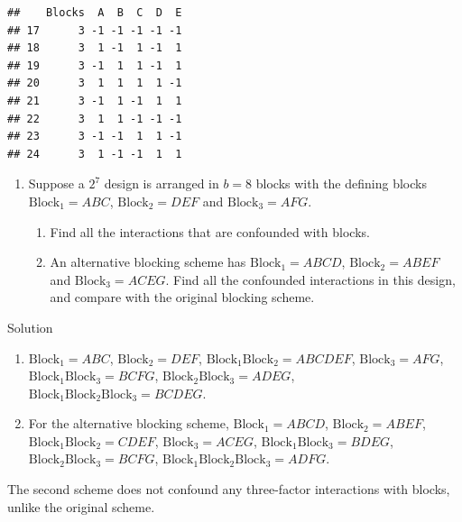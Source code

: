 \documentclass[
]{book}
\theoremstyle{definition}
\theoremstyle{definition}
\theoremstyle{definition}
\theoremstyle{definition}
\theoremstyle{remark}
\begin{document}
\begin{verbatim}
##    Blocks  A  B  C  D  E
## 17      3 -1 -1 -1 -1 -1
## 18      3  1 -1  1 -1  1
## 19      3 -1  1  1 -1  1
## 20      3  1  1  1  1 -1
## 21      3 -1  1 -1  1  1
## 22      3  1  1 -1 -1 -1
## 23      3 -1 -1  1  1 -1
## 24      3  1 -1 -1  1  1
\end{verbatim}

\begin{enumerate}
\def\labelenumi{\arabic{enumi}.}
\setcounter{enumi}{1}
\item
  Suppose a \(2^7\) design is arranged in \(b=8\) blocks with the defining blocks \(\mathrm{Block}_1 = ABC\), \(\mathrm{Block}_2 = DEF\) and \(\mathrm{Block}_3 = AFG\).

  \begin{enumerate}
  \def\labelenumii{\alph{enumii}.}
  \item
    Find all the interactions that are confounded with blocks.
  \item
    An alternative blocking scheme has \(\mathrm{Block}_1 = ABCD\), \(\mathrm{Block}_2 = ABEF\) and \(\mathrm{Block}_3 = ACEG\). Find all the confounded interactions in this design, and compare with the original blocking scheme.
  \end{enumerate}
\end{enumerate}

Solution

\begin{enumerate}
\def\labelenumi{\alph{enumi}.}
\item
  \(\mathrm{Block}_1 = ABC\), \(\mathrm{Block}_2 = DEF\), \(\mathrm{Block}_1\mathrm{Block}_2 = ABCDEF\), \(\mathrm{Block}_3 = AFG\), \(\mathrm{Block}_1\mathrm{Block}_3 = BCFG\), \(\mathrm{Block}_2\mathrm{Block}_3 = ADEG\), \(\mathrm{Block}_1\mathrm{Block}_2\mathrm{Block}_3 = BCDEG\).
\item
  For the alternative blocking scheme, \(\mathrm{Block}_1 = ABCD\), \(\mathrm{Block}_2 = ABEF\), \(\mathrm{Block}_1\mathrm{Block}_2 = CDEF\), \(\mathrm{Block}_3 = ACEG\), \(\mathrm{Block}_1\mathrm{Block}_3 = BDEG\), \(\mathrm{Block}_2\mathrm{Block}_3 = BCFG\), \(\mathrm{Block}_1\mathrm{Block}_2\mathrm{Block}_3 = ADFG\).
\end{enumerate}

The second scheme does not confound any three-factor interactions with blocks, unlike the original scheme.
\end{document}

